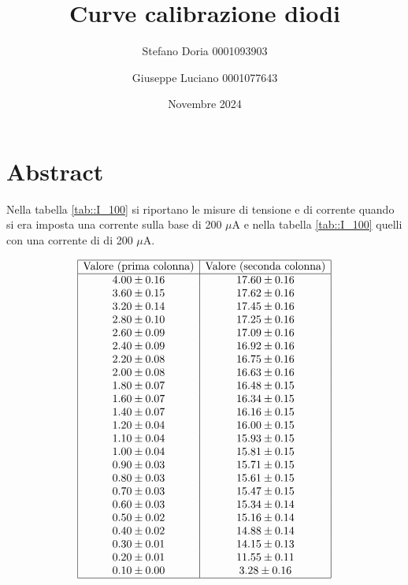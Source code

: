 \documentclass[a4paper,11pt]{article}
\begin{document}
\title{\textbf{Curve calibrazione diodi}}
\author{Stefano Doria 0001093903 \and Giuseppe Luciano 0001077643}
\date{Novembre 2024}

\maketitle

\section{Abstract}

Nella tabella \ref{tab::I_100} si riportano le misure di tensione e di corrente quando si era imposta una corrente sulla base di 200 $\mu \mathrm{A}$ e nella tabella \ref{tab::I_100} quelli con una corrente di di 200 $\mu \mathrm{A}$.

\[
\begin{array}{|c|c|}
\hline
\text{Valore (prima colonna)} & \text{Valore (seconda colonna)} \\ \hline
4.00 \pm 0.16 & 17.60 \pm 0.16 \\ 
3.60 \pm 0.15 & 17.62 \pm 0.16 \\ 
3.20 \pm 0.14 & 17.45 \pm 0.16 \\ 
2.80 \pm 0.10 & 17.25 \pm 0.16 \\ 
2.60 \pm 0.09 & 17.09 \pm 0.16 \\ 
2.40 \pm 0.09 & 16.92 \pm 0.16 \\ 
2.20 \pm 0.08 & 16.75 \pm 0.16 \\ 
2.00 \pm 0.08 & 16.63 \pm 0.16 \\ 
1.80 \pm 0.07 & 16.48 \pm 0.15 \\ 
1.60 \pm 0.07 & 16.34 \pm 0.15 \\ 
1.40 \pm 0.07 & 16.16 \pm 0.15 \\ 
1.20 \pm 0.04 & 16.00 \pm 0.15 \\ 
1.10 \pm 0.04 & 15.93 \pm 0.15 \\ 
1.00 \pm 0.04 & 15.81 \pm 0.15 \\ 
0.90 \pm 0.03 & 15.71 \pm 0.15 \\ 
0.80 \pm 0.03 & 15.61 \pm 0.15 \\ 
0.70 \pm 0.03 & 15.47 \pm 0.15 \\ 
0.60 \pm 0.03 & 15.34 \pm 0.14 \\ 
0.50 \pm 0.02 & 15.16 \pm 0.14 \\ 
0.40 \pm 0.02 & 14.88 \pm 0.14 \\ 
0.30 \pm 0.01 & 14.15 \pm 0.13 \\ 
0.20 \pm 0.01 & 11.55 \pm 0.11 \\ 
0.10 \pm 0.00 & 3.28 \pm 0.16 \\ \hline
\end{array}
\]
\end{document}
